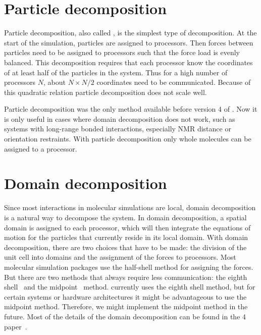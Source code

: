 \section{Particle decomposition}
Particle decomposition, also called ,
is the simplest type of decomposition. At the start of the simulation,
particles are assigned to processors. Then forces between particles
need to be assigned to processors such that the force load is evenly balanced.
This decomposition requires that each processor know the coordinates
of at least half of the particles in the system.
Thus for a high number of processors $N$, about $N \times N/2$ coordinates
need to be communicated. Because of this quadratic relation
particle decomposition does not scale well.

Particle decomposition was the only method available before version 4
of {\gromacs}. Now it is only useful in cases where domain decomposition
does not work, such as systems with long-range bonded interactions,
especially NMR distance or orientation restraints.
With particle decomposition only whole molecules can be assigned to a processor.

\section{Domain decomposition}
Since most interactions in molecular simulations are local,
domain decomposition is a natural way to decompose the system.
In domain decomposition, a spatial domain is assigned to each processor,
which will then integrate the equations of motion for the particles
that currently reside in its local domain. With domain decomposition,
there are two choices that have to be made: the division of the unit cell
into domains and the assignment of the forces to processors.
Most molecular simulation packages use the half-shell method for assigning
the forces. But there are two methods that always require less communication:
the eighth shell~\cite{Liem1991} and the midpoint~\cite{Shaw2006} method.
{\gromacs} currently uses the eighth shell method, but for certain systems
or hardware architectures it might be advantageous to use the midpoint
method. Therefore, we might implement the midpoint method in the future.
Most of the details of the domain decomposition can be found
in the {\gromacs} 4 paper~\cite{Hess2008b}.

